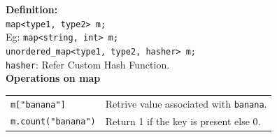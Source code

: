 \textbf{Definition:}\\
\texttt{map<type1, type2> m;}\\
Eg: \texttt{map<string, int> m;}\\
\texttt{unordered\_map<type1, type2, hasher> m;}\\
\texttt{hasher}: Refer Custom Hash Function.\\

\textbf{Operations on map}\\
\begin{tabularx}{\linewidth}{lX}
\texttt{m["banana"]} & Retrive value associated with \texttt{banana}.\\
\texttt{m.count("banana")} & Return 1 if the key is present else 0.\\
\end{tabularx}
